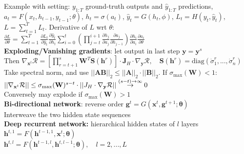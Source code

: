 Example with setting: $y_{1:T}$ ground-truth outputs and $\hat y_{1:T}$ predictions, $a_t=F(x_t,h_{t-1},y_{t-1};\theta)$, $h_t=\sigma(a_t)$, $\hat y_t=G(h_t,\phi)$, $L_t=H(y_t,\hat y_t)$, $L=\sum_{t=1}^TL_t$. Derivative of $L$ wrt $\theta$:\\
$\frac{\partial L}{\partial \theta}=\sum_{t=1}^T\frac{\partial L_t}{\partial \hat y_t}\frac{\partial \hat y_t}{\partial h_t}\sum_{i=0}^t(\prod_{j=t}^{i+1}\frac{\partial h_j}{\partial a_j}\frac{\partial a_j}{\partial h_{j-1}})\frac{\partial h_i}{\partial a_i}\frac{\partial a_i}{\partial\theta}$\\
\textbf{Exploding/Vanishing gradients}: let  output in last step $\mathbf y=\mathbf y^s$\\
Then $\nabla_{\mathbf x^t}\mathcal R=[\prod_{r=t+1}^s\mathbf W^T\mathbf{S}(\mathbf h^r)]\cdot\mathbf J_H\cdot\nabla_\mathbf y\mathcal R, \quad \mathbf{S}(\mathbf h^r)=\text{diag}(\dot\sigma_1^r,...,\dot\sigma_n^r)$\\
Take spectral norm, and use $||\mathbf{AB}||_2\leq||\mathbf A||_2\cdot||\mathbf B||_2$. If $\sigma_{\max}(\mathbf W)<1$:\\ $||\nabla_{\mathbf x^t}\mathcal R||\leq\sigma_{\max}(\mathbf W)^{s-t}\cdot||\mathbf \mathbf J_H\cdot\nabla_\mathbf y\mathcal R||\overset{(s-t)\rightarrow\infty}{\rightarrow}0$\\
Conversely may explode if $\sigma_{\max}(\mathbf W)>1$\\
\textbf{Bi-directional network}: reverse order $\mathbf g^t=G(\mathbf x^t,\mathbf g^{t+1};\pmb\theta)$\\
Interweave the two hidden state sequences\\
\textbf{Deep recurrent network:} hierarchical hidden states of $l$ layers\\
$\mathbf h^{t,1}=F(\mathbf h^{t-1,1},\mathbf x^t;\pmb\theta)$\\
$\mathbf h^{t,l}=F(\mathbf h^{t-1,l},\mathbf h^{t,l-1};\pmb\theta), \quad l=2,...,L$
